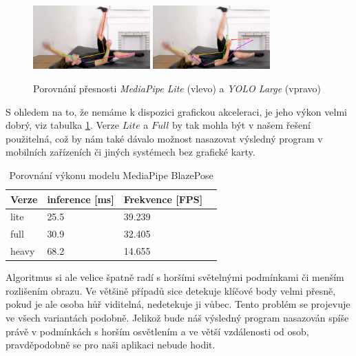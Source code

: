 \begin{figure}
    \centering
    \includegraphics[width=0.4\textwidth]{Figures/pose_tests/mh1.png}
    \includegraphics[width=0.4\textwidth]{Figures/pose_tests/yl1.png}
    \caption{Porovnání přesnosti \textit{MediaPipe Lite} (vlevo) a \textit{YOLO Large} (vpravo)}
    \label{fig:ym_comparison}
\end{figure}

S ohledem na to, že nemáme k dispozici grafickou akceleraci, je jeho výkon
velmi dobrý, viz tabulka \ref{tab:mediapipe_performance}. Verze $Lite$ a $Full$
by tak mohla být v našem řešení použitelná, což by nám také dávalo možnost
nasazovat výsledný program v mobilních zařízeních či jiných systémech bez
grafické karty.

\begin{table}[htbp]
    \centering
    \caption{Porovnání výkonu modelu MediaPipe BlazePose}
    \label{tab:mediapipe_performance}
    \begin{tabular}{|l|l|l|l|}
        \hline
        \textbf{Verze} & \textbf{inference [ms]} & \textbf{Frekvence [FPS]} \\
        \hline
        lite           & 25.5                    & 39.239                   \\ \hline
        full           & 30.9                    & 32.405                   \\ \hline
        heavy          & 68.2                    & 14.655                   \\ \hline
    \end{tabular}
\end{table}

Algoritmus si ale velice špatně radí s horšími světelnými podmínkami či menším
rozlišením obrazu. Ve většině případů sice detekuje klíčové body velmi přesně,
pokud je ale osoba hůř viditelná, nedetekuje ji vůbec. Tento problém se
projevuje ve všech variantách podobně. Jelikož bude náš výsledný program
nasazován spíše právě v podmínkách s horším osvětlením a ve větší vzdálenosti
od osob, pravděpodobně se pro naši aplikaci nebude hodit.

